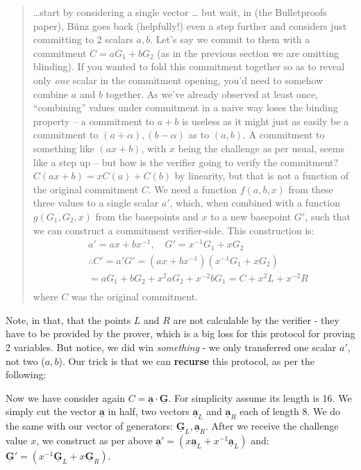 \documentclass[10pt,a4paper]{article}
\begin{document}
\begin{quote}
\ldots start by considering a single vector \ldots{} but wait, in (the Bulletproofs paper), Bünz goes back (helpfully!) even a step further and considers just committing to 2 scalars $a, b$. Let's say we commit to them with a commitment $C = aG_1 + bG_2$ (as in the previous section we are omitting blinding). If you wanted to fold this commitment together so as to reveal only \emph{one} scalar in the commitment opening, you'd need to somehow combine $a$ and $b$ together. As we've already observed at least once, ``combining'' values under commitment in a naive way loses the binding property -- a commitment to $a+b$ is useless as it might just as easily be a commitment to $(a+\alpha), (b-\alpha)$ as to $(a, b)$. A commitment to something like $(ax+b)$, with $x$ being the challenge as per usual, seems like a step up -- but how is the verifier going to verify the commitment? $C(ax+b) = xC(a) + C(b)$ by linearity, but that is not a function of the original commitment $C$. We need a function $f(a, b, x)$ from these three values to a single scalar $a'$, which, when combined with a function $g(G_1, G_2, x)$ from the basepoints and $x$ to a new basepoint $G'$, such that we can construct a commitment verifier-side.
This construction is:
\begin{align*}
& a' = ax + bx^{-1},\quad G' = x^{-1}G_1 + xG_2 \\
& \therefore C' = a'G' = \left(ax+bx^{-1}\right)\left(x^{-1}G_1 + xG_2\right) \\
& = aG_1 + bG_2 + x^2aG_2 + x^{-2}bG_1 = C + x^2L + x^{-2}R \\
\end{align*}
where $C$ was the original commitment.
\end{quote}

\vspace{5 pt}

Note, in that, that the points $L$ and $R$ are not calculable by the verifier - they have to be provided by the prover, which is a big loss for this protocol for proving 2 variables. But notice, we did win \emph{something} - we only transferred one scalar $a'$, not two ($a,b$). Our trick is that we can \textbf{recurse} this protocol, as per the following:

\vspace{5 pt}

Now we have consider again $C = \underline{\textbf{a}} \cdot \underline{\textbf{G}}$. For simplicity assume its length is 16. We simply cut the vector $\underline{\textbf{a}}$ in half, two vectors $\underline{\textbf{a}}_L$ and $\underline{\textbf{a}}_R$ each of length 8. We do the same with our vector of generators: $\underline{\textbf{G}}_L, \underline{\textbf{a}}_R$. After we receive the challenge value $x$, we construct as per above $\underline{\textbf{a}}' = (x\underline{\textbf{a}}_L + x^{-1}\underline{\textbf{a}}_L)$ and: $\underline{\textbf{G}}' = (x^{-1}\underline{\textbf{G}}_L + x\underline{\textbf{G}}_R)$.
\end{document}
